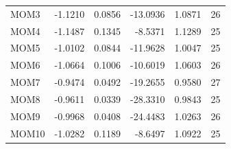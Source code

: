 \begin{table}[!htbp]
\begin{tabular}{lrrrrr}
    MOM3 & -1.1210 & 0.0856 & -13.0936 & 1.0871 & 26 \\
    MOM4 & -1.1487 & 0.1345 & -8.5371 & 1.1289 & 25 \\
    MOM5 & -1.0102 & 0.0844 & -11.9628 & 1.0047 & 25 \\
    MOM6 & -1.0664 & 0.1006 & -10.6019 & 1.0603 & 26 \\
    MOM7 & -0.9474 & 0.0492 & -19.2655 & 0.9580 & 27 \\
    MOM8 & -0.9611 & 0.0339 & -28.3310 & 0.9843 & 25 \\
    MOM9 & -0.9968 & 0.0408 & -24.4483 & 1.0263 & 26 \\
    MOM10 & -1.0282 & 0.1189 & -8.6497 & 1.0922 & 25 \\
    \bottomrule
  \end{tabular}
\end{table}
